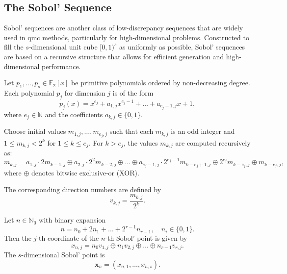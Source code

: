   \subsection{The Sobol' Sequence}

Sobol' sequences are another class of low-discrepancy sequences that are widely
used in \ac{qmc} methods, particularly for high-dimensional problems.
Constructed to fill the $s$-dimensional unit cube $[0,1)^s$ as uniformly as
possible, Sobol' sequences are based on a recursive structure that allows for
efficient generation and high-dimensional performance.

\begin{definition}
Let $p_1, \dots, p_s \in \mathbb{F}_2[x]$ be primitive polynomials ordered by non-decreasing degree. Each polynomial $p_j$ for dimension $j$ is of the form
\begin{equation*}
    p_j(x) = x^{e_j} + a_{1,j}x^{e_j - 1} + \dots + a_{e_j - 1,j}x + 1,
\end{equation*}
where $e_j \in \mathbb{N}$ and the coefficients $a_{k,j} \in \{0,1\}$.

Choose initial values $m_{1,j}, \dots, m_{e_j,j}$ such that each $m_{k,j}$ is an odd integer and $1 \leq m_{k,j} < 2^k$ for $1 \leq k \leq e_j$. For $k > e_j$, the values $m_{k,j}$ are computed recursively as:
\begin{equation*}
    m_{k,j} = a_{1,j} \cdot 2 m_{k-1,j} \oplus a_{2,j} \cdot 2^2 m_{k-2,j} \oplus \dots \oplus a_{e_j-1,j} \cdot 2^{e_j-1} m_{k-e_j+1,j} \oplus 2^{e_j} m_{k-e_j,j} \oplus m_{k-e_j,j},
\end{equation*}
where $\oplus$ denotes bitwise exclusive-or (XOR).

The corresponding direction numbers are defined by
\begin{equation*}
    v_{k,j} = \frac{m_{k,j}}{2^k}.
\end{equation*}

Let $n \in \mathbb{N}_0$ with binary expansion
\begin{equation*}
    n = n_0 + 2n_1 + \dots + 2^{r-1}n_{r-1}, \quad n_i \in \{0,1\}.
\end{equation*}
Then the $j$-th coordinate of the $n$-th Sobol' point is given by
\begin{equation*}
    x_{n,j} = n_0 v_{1,j} \oplus n_1 v_{2,j} \oplus \dots \oplus n_{r-1} v_{r,j}.
\end{equation*}
The $s$-dimensional Sobol' point is
\begin{equation*}
    \boldsymbol{x}_n = (x_{n,1}, \dots, x_{n,s}).
\end{equation*}
\end{definition}

